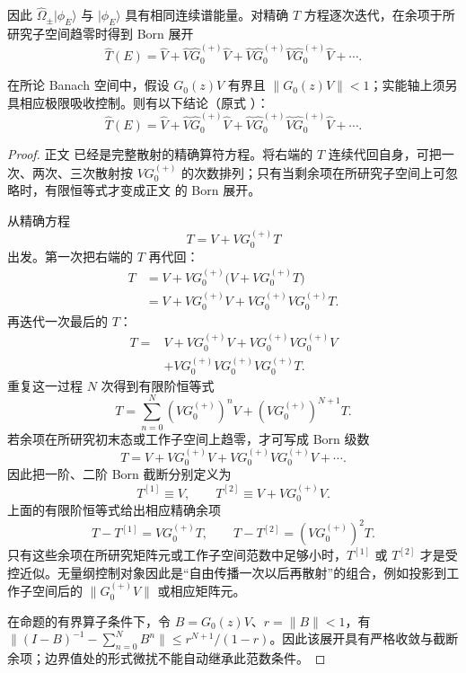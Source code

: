 因此 $\hat\Omega_\pm|\phi_E\rangle$ 与 $|\phi_E\rangle$ 具有相同连续谱能量。对精确 $T$ 方程逐次迭代，在余项于所研究子空间趋零时得到 Born 展开
\begin{equation}
 \boxed{
 \hat T(E)=\hat V+\hat V\hat G_0^{(+)}\hat V
 +\hat V\hat G_0^{(+)}\hat V\hat G_0^{(+)}\hat V+\cdots.}
 \label{eq:born-series-r68}
\end{equation}

\begin{proposition}
在所论 Banach 空间中，假设 $G_0(z)V$ 有界且 $\|G_0(z)V\|<1$；实能轴上须另具相应极限吸收控制。则有以下结论（原式 ）：
\begin{equation*}
 \boxed{
 \hat T(E)=\hat V+\hat V\hat G_0^{(+)}\hat V
 +\hat V\hat G_0^{(+)}\hat V\hat G_0^{(+)}\hat V+\cdots.}
\end{equation*}
\end{proposition}
\begin{proof}
正文 已经是完整散射的精确算符方程。将右端的 $T$ 连续代回自身，可把一次、两次、三次散射按 $V G_0^{(+)}$ 的次数排列；只有当剩余项在所研究子空间上可忽略时，有限恒等式才变成正文 的 Born 展开。


从精确方程
\begin{equation*}
T=V+VG_0^{(+)}T
\end{equation*}
出发。第一次把右端的 $T$ 再代回：
\begin{align*}
T
&=V+VG_0^{(+)}\big(V+VG_0^{(+)}T\big)\\
&=V+VG_0^{(+)}V+VG_0^{(+)}VG_0^{(+)}T.
\end{align*}
再迭代一次最后的 $T$：
\begin{align*}
T
={}&V+VG_0^{(+)}V+VG_0^{(+)}VG_0^{(+)}V\\
&+VG_0^{(+)}VG_0^{(+)}VG_0^{(+)}T.
\end{align*}
重复这一过程 $N$ 次得到有限阶恒等式
\begin{equation*}
T=\sum_{n=0}^{N}(VG_0^{(+)})^nV+(VG_0^{(+)})^{N+1}T.
\end{equation*}
若余项在所研究初末态或工作子空间上趋零，才可写成 Born 级数
\begin{equation*}
T=V+VG_0^{(+)}V+VG_0^{(+)}VG_0^{(+)}V+\cdots.
\end{equation*}
因此把一阶、二阶 Born 截断分别定义为
\begin{equation*}
T^{[1]}\equiv V,
\qquad
T^{[2]}\equiv V+VG_0^{(+)}V.
\end{equation*}
上面的有限阶恒等式给出相应精确余项
\begin{equation*}
T-T^{[1]}=VG_0^{(+)}T,
\qquad
T-T^{[2]}=(VG_0^{(+)})^2T.
\end{equation*}
只有这些余项在所研究矩阵元或工作子空间范数中足够小时，$T^{[1]}$ 或 $T^{[2]}$ 才是受控近似。无量纲控制对象因此是“自由传播一次以后再散射”的组合，例如投影到工作子空间后的 $\|G_0^{(+)}V\|$ 或相应矩阵元。

在命题的有界算子条件下，令 $B=G_0(z)V$、$r=\|B\|<1$，有 $\|(I-B)^{-1}-\sum_{n=0}^N B^n\|\le r^{N+1}/(1-r)$。因此该展开具有严格收敛与截断余项；边界值处的形式微扰不能自动继承此范数条件。
\end{proof}

